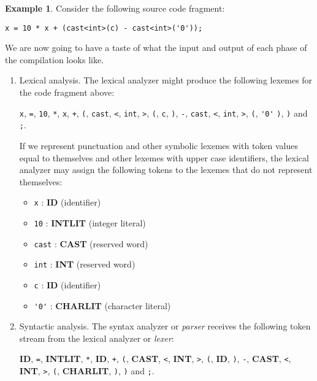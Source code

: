 \documentclass[a4paper,oneside,11pt]{book}
\theoremstyle{definition}
\newtheorem{exmp}{Example}[section]
\begin{document}
\begin{exmp}
Consider the following source code fragment:

\begin{lstlisting}
x = 10 * x + (cast<int>(c) - cast<int>('0'));
\end{lstlisting}

We are now going to have a taste of what the input and output of each phase of the compilation looks like.

\begin{enumerate}
\item
Lexical analysis. The lexical analyzer might produce the following lexemes for the code fragment above:
\begin{flushleft}
\verb|x|, \verb|=|, \verb|10|, \verb|*|, \verb|x|, \verb|+|, \verb|(|,
\verb|cast|, \verb|<|, \verb|int|, \verb|>|, \verb|(|, \verb|c|, \verb|)|, \verb|-|, \verb|cast|,
\verb|<|, \verb|int|, \verb|>|, \verb|(|, \verb|'0'| \verb|)|, \verb|)| and \verb|;|.
\end{flushleft}

If we represent punctuation and other symbolic lexemes with token values equal to themselves and
other lexemes with upper case identifiers, the lexical analyzer may assign the following tokens
to the lexemes that do not represent themselves:

\begin{itemize}
\item
\verb|x| : \textbf{ID} (identifier)
\item
\verb|10| : \textbf{INTLIT} (integer literal)
\item
\verb|cast| : \textbf{CAST} (reserved word)
\item
\verb|int| : \textbf{INT} (reserved word)
\item
\verb|c| : \textbf{ID} (identifier)
\item
\verb|'0'| : \textbf{CHARLIT} (character literal)
\end{itemize}

\item
Syntactic analysis.
The syntax analyzer or \emph{parser} receives the following
token stream from the lexical analyzer or \emph{lexer}:
\begin{flushleft}
\textbf{ID}, \verb|=|, \textbf{INTLIT}, \verb|*|, \textbf{ID}, \verb|+|, \verb|(|,
\textbf{CAST}, \verb|<|, \textbf{INT}, \verb|>|, \verb|(|, \textbf{ID}, \verb|)|, \verb|-|,
\textbf{CAST}, \verb|<|, \textbf{INT}, \verb|>|, \verb|(|, \textbf{CHARLIT}, \verb|)|,
\verb|)| and \verb|;|.
\end{flushleft}


\end{enumerate}
\end{exmp}
\end{document}
